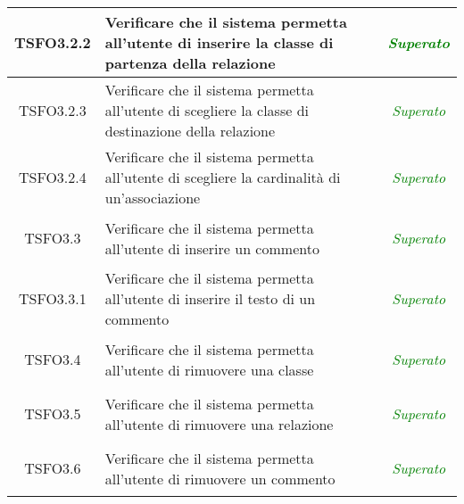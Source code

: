 \begin{longtable}{|c|>{}m{8cm}|c|}
\hypertarget{TSFO3.2.2}{TSFO3.2.2} & Verificare che il sistema permetta all'utente di inserire la classe di partenza della relazione & \textcolor{Green}{\textit{Superato}}\\ \hline
\hypertarget{TSFO3.2.3}{TSFO3.2.3} & Verificare che il sistema permetta all'utente di scegliere la classe di destinazione della relazione & \textcolor{Green}{\textit{Superato}}\\ \hline
\hypertarget{TSFO3.2.4}{TSFO3.2.4} & Verificare che il sistema permetta all'utente di scegliere la cardinalità di un'associazione & \textcolor{Green}{\textit{Superato}}\\ \hline
\hypertarget{TSFO3.3}{TSFO3.3} & Verificare che il sistema permetta all'utente di inserire un commento & \textcolor{Green}{\textit{Superato}}\\ \hline
\hypertarget{TSFO3.3.1}{TSFO3.3.1} & Verificare che il sistema permetta all'utente di inserire il testo di un commento & \textcolor{Green}{\textit{Superato}}\\ \hline

\hypertarget{TSFO3.4}{TSFO3.4} & Verificare che il sistema permetta all'utente di rimuovere una classe & \textcolor{Green}{\textit{Superato}}\\ \hline
\hypertarget{TSFO3.5}{TSFO3.5} & Verificare che il sistema permetta all'utente di rimuovere una relazione & \textcolor{Green}{\textit{Superato}}\\ \hline
\hypertarget{TSFO3.6}{TSFO3.6} & Verificare che il sistema permetta all'utente di rimuovere un commento & \textcolor{Green}{\textit{Superato}}\\ \hline


\end{longtable}
